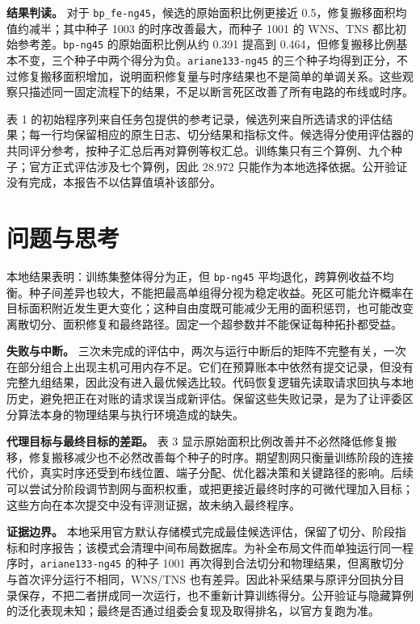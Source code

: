 \documentclass[UTF8,a4paper,11pt]{ctexart}
\begin{document}
\textbf{结果判读。} 对于 \texttt{bp\_fe-ng45}，候选的原始面积比例更接近 0.5，修复搬移面积均值约减半；其中种子 1003 的时序改善最大，而种子 1001 的 WNS、TNS 都比初始参考差。\texttt{bp-ng45} 的原始面积比例从约 0.391 提高到 0.464，但修复搬移比例基本不变，三个种子中两个得分为负。\texttt{ariane133-ng45} 的三个种子均得到正分，不过修复搬移面积增加，说明面积修复量与时序结果也不是简单的单调关系。这些观察只描述同一固定流程下的结果，不足以断言死区改善了所有电路的布线或时序。

表 1 的初始程序列来自任务包提供的参考记录，候选列来自所选请求的评估结果；每一行均保留相应的原生日志、切分结果和指标文件。候选得分使用评估器的共同评分参考，按种子汇总后再对算例等权汇总。训练集只有三个算例、九个种子；官方正式评估涉及七个算例，因此 28.972 只能作为本地选择依据。公开验证没有完成，本报告不以估算值填补该部分。

\section{问题与思考}
本地结果表明：训练集整体得分为正，但 \texttt{bp-ng45} 平均退化，跨算例收益不均衡。种子间差异也较大，不能把最高单组得分视为稳定收益。死区可能允许概率在目标面积附近发生更大变化；这种自由度既可能减少无用的面积惩罚，也可能改变离散切分、面积修复和最终路径。固定一个超参数并不能保证每种拓扑都受益。

\textbf{失败与中断。} 三次未完成的评估中，两次与运行中断后的矩阵不完整有关，一次在部分组合上出现主机可用内存不足。它们在预算账本中依然有提交记录，但没有完整九组结果，因此没有进入最优候选比较。代码恢复逻辑先读取请求回执与本地历史，避免把正在对账的请求误当成新评估。保留这些失败记录，是为了让评委区分算法本身的物理结果与执行环境造成的缺失。

\textbf{代理目标与最终目标的差距。} 表 3 显示原始面积比例改善并不必然降低修复搬移，修复搬移减少也不必然改善每个种子的时序。期望割网只衡量训练阶段的连接代价，真实时序还受到布线位置、端子分配、优化器决策和关键路径的影响。后续可以尝试分阶段调节割网与面积权重，或把更接近最终时序的可微代理加入目标；这些方向在本次提交中没有评测证据，故未纳入最终程序。

\textbf{证据边界。} 本地采用官方默认存储模式完成最佳候选评估，保留了切分、阶段指标和时序报告；该模式会清理中间布局数据库。为补全布局文件而单独运行同一程序时，\texttt{ariane133-ng45} 的种子 1001 再次得到合法切分和物理结果，但离散切分与首次评分运行不相同，WNS/TNS 也有差异。因此补采结果与原评分回执分目录保存，不把二者拼成同一次运行，也不重新计算训练得分。公开验证与隐藏算例的泛化表现未知；最终是否通过组委会复现及取得排名，以官方复跑为准。
\end{document}
